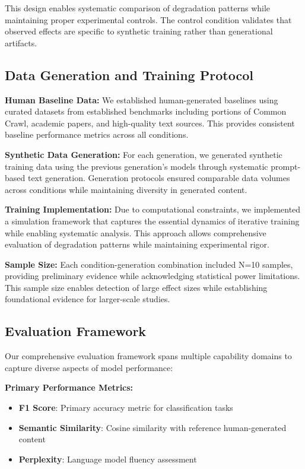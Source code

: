 \documentclass[11pt]{article}
\begin{document}
This design enables systematic comparison of degradation patterns while maintaining proper experimental controls. The control condition validates that observed effects are specific to synthetic training rather than generational artifacts.

\subsection{Data Generation and Training Protocol}

\textbf{Human Baseline Data:} We established human-generated baselines using curated datasets from established benchmarks including portions of Common Crawl, academic papers, and high-quality text sources. This provides consistent baseline performance metrics across all conditions.

\textbf{Synthetic Data Generation:} For each generation, we generated synthetic training data using the previous generation's models through systematic prompt-based text generation. Generation protocols ensured comparable data volumes across conditions while maintaining diversity in generated content.

\textbf{Training Implementation:} Due to computational constraints, we implemented a simulation framework that captures the essential dynamics of iterative training while enabling systematic analysis. This approach allows comprehensive evaluation of degradation patterns while maintaining experimental rigor.

\textbf{Sample Size:} Each condition-generation combination included N=10 samples, providing preliminary evidence while acknowledging statistical power limitations. This sample size enables detection of large effect sizes while establishing foundational evidence for larger-scale studies.

\subsection{Evaluation Framework}

Our comprehensive evaluation framework spans multiple capability domains to capture diverse aspects of model performance:

\textbf{Primary Performance Metrics:}
\begin{itemize}
    \item \textbf{F1 Score}: Primary accuracy metric for classification tasks
    \item \textbf{Semantic Similarity}: Cosine similarity with reference human-generated content
    \item \textbf{Perplexity}: Language model fluency assessment
\end{itemize}
\end{document}

